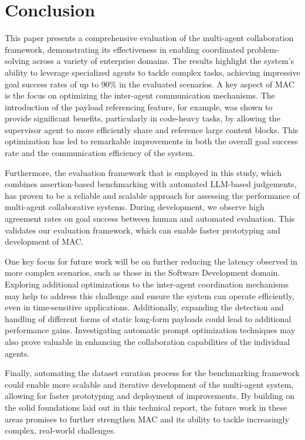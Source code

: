 \section{Conclusion}
\label{sec:conclusion}

This paper presents a comprehensive evaluation of the multi-agent collaboration framework, demonstrating its effectiveness in enabling coordinated problem-solving across a variety of enterprise domains. The results highlight the system's ability to leverage specialized agents to tackle complex tasks, achieving impressive goal success rates of up to 90\% in the evaluated scenarios. A key aspect of MAC is the focus on optimizing the inter-agent communication mechanisms. The introduction of the payload referencing feature, for example, was shown to provide significant benefits, particularly in code-heavy tasks, by allowing the supervisor agent to more efficiently share and reference large content blocks. This optimization  has led to remarkable improvements in both the overall goal success rate and the communication efficiency of the system.

Furthermore, the evaluation framework that is employed in this study, which combines assertion-based benchmarking with automated LLM-based judgements, has proven to be a reliable and scalable approach for assessing the performance of multi-agent collaborative systems. During development, we observe high agreement rates on goal success between human and automated evaluation. This validates our evaluation framework, which can enable faster prototyping and development of MAC.

One key focus for future work will be on further reducing the latency observed in more complex scenarios, such as those in the Software Development domain. Exploring additional optimizations to the inter-agent coordination mechanisms may help to address this challenge and ensure the system can operate efficiently, even in time-sensitive applications. Additionally, expanding the detection and handling of different forms of static long-form payloads could lead to additional performance gains. Investigating automatic prompt optimization techniques may also prove valuable in enhancing the collaboration capabilities of the individual agents.

Finally, automating the dataset curation process for the benchmarking framework could enable more scalable and iterative development of the multi-agent system, allowing for faster prototyping and deployment of improvements. By building on the solid foundations laid out in this technical report, the future work in these areas promises to further strengthen MAC and its ability to tackle increasingly complex, real-world challenges.

